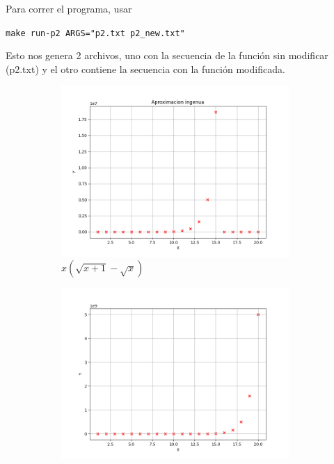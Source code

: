 \begin{solution}
  Para correr el programa, usar
  \begin{center}
    \texttt{make run-p2 ARGS="p2.txt p2\_new.txt"}
  \end{center}
  Esto nos genera 2 archivos, uno con la secuencia de la funci\'on sin modificar (p2.txt) y el otro contiene la secuencia con la funci\'on modificada.
	\begin{figure}[H]
		\begin{subfigure}{.45\textwidth}
			\centering
			\includegraphics[width=0.95\textwidth]{p2_ing.png}
			\caption{$ x(\sqrt{x+1} - \sqrt{x}) $}
			\label{fig:f_ing}
		\end{subfigure}
		\hfill
		\begin{subfigure}{.45\textwidth}
			\centering
			\includegraphics[width=0.95\textwidth]{p2.png}

\end{subfigure}
\end{figure}
\end{solution}
